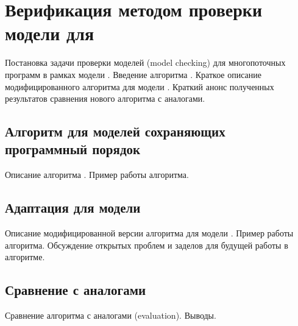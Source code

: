 \chapter{Верификация методом проверки модели для \WkmS}
\label{ch:mc-weakestmo2}

Постановка задачи проверки моделей (model checking)
для многопоточных программ в рамках модели \WkmS.
Введение алгоритма \genmc.
Краткое описание модифицированного алгоритма \genmc
для модели \WkmS.
Краткий анонс полученных результатов сравнения нового алгоритма
с аналогами. 

\section{Алгоритм \genmc для моделей сохраняющих программный порядок}

Описание алгоритма \genmc. Пример работы алгоритма. 

\section{Адаптация \genmc для модели \WkmS}

Описание модифицированной версии алгоритма \genmc
для модели \WkmS. Пример работы алгоритма.
Обсуждение открытых проблем и заделов
для будущей работы в алгоритме. 

\section{Сравнение с аналогами}

Сравнение алгоритма с аналогами (evaluation). Выводы. 
